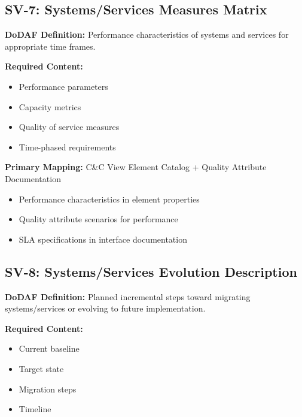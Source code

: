 \documentclass[11pt]{article}
\begin{document}
\subsection{SV-7: Systems/Services Measures Matrix}

\begin{dodafbox}
\textbf{DoDAF Definition:} Performance characteristics of systems and services for appropriate time frames.

\textbf{Required Content:}
\begin{itemize}[nosep]
    \item Performance parameters
    \item Capacity metrics
    \item Quality of service measures
    \item Time-phased requirements
\end{itemize}
\end{dodafbox}

\begin{vbbox}
\textbf{Primary Mapping:} C\&C View Element Catalog + Quality Attribute Documentation

\begin{itemize}
    \item Performance characteristics in element properties
    \item Quality attribute scenarios for performance
    \item SLA specifications in interface documentation
\end{itemize}
\end{vbbox}

\subsection{SV-8: Systems/Services Evolution Description}

\begin{dodafbox}
\textbf{DoDAF Definition:} Planned incremental steps toward migrating systems/services or evolving to future implementation.

\textbf{Required Content:}
\begin{itemize}[nosep]
    \item Current baseline
    \item Target state
    \item Migration steps
    \item Timeline
\end{itemize}
\end{dodafbox}
\end{document}
